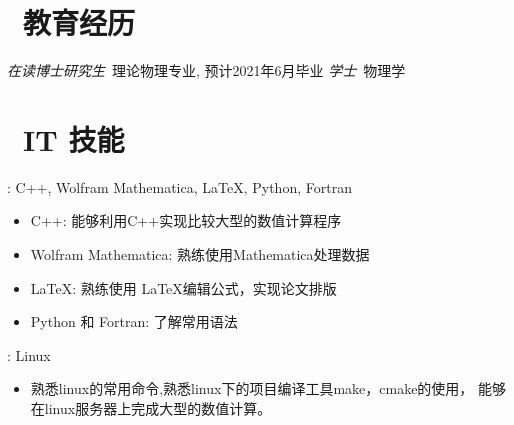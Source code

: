 \documentclass{resume}
\begin{document}
\section{\faGraduationCap\ 教育经历}
\textit{在读博士研究生}\ 理论物理专业, 预计2021年6月毕业
\textit{学士}\ 物理学

\section{\faCogs\ IT 技能}
\begin{description}[parsep=0.5ex]
  \item[编程语言]: C++, Wolfram Mathematica, \LaTeX, Python, Fortran
  \begin{itemize}
    \item C++: 能够利用C++实现比较大型的数值计算程序
    \item Wolfram Mathematica: 熟练使用Mathematica处理数据
    \item \LaTeX : 熟练使用 \LaTeX 编辑公式，实现论文排版
    \item Python 和 Fortran: 了解常用语法
  \end{itemize}
  \item[平台]: Linux
  \begin{itemize}
    \item 熟悉linux的常用命令,熟悉linux下的项目编译工具make，cmake的使用，
          能够在linux服务器上完成大型的数值计算。
  \end{itemize} 
\end{description}
\end{document}

